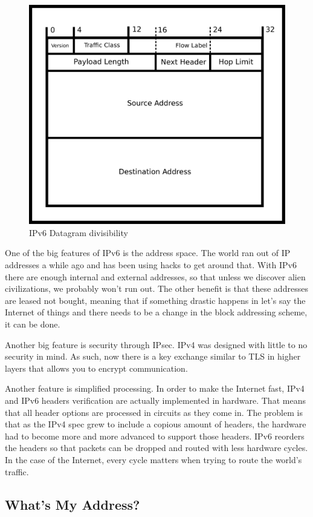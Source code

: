 \begin{figure}[H]
  \centering
\includegraphics[width=.8\textwidth]{networking/drawings/ipv6_datagram.eps}
\caption{IPv6 Datagram divisibility}
\end{figure}

One of the big features of IPv6 is the address space.
The world ran out of IP addresses a while ago and has been using hacks to get around that.
With IPv6 there are enough internal and external addresses, so that unless we discover alien civilizations, we probably won't run out.
The other benefit is that these addresses are leased not bought, meaning that if something drastic happens in let's say the Internet of things and there needs to be a change in the block addressing scheme, it can be done.

Another big feature is security through IPsec.
IPv4 was designed with little to no security in mind.
As such, now there is a key exchange similar to TLS in higher layers that allows you to encrypt communication.

Another feature is simplified processing.
In order to make the Internet fast, IPv4 and IPv6 headers verification are actually implemented in hardware.
That means that all header options are processed in circuits as they come in.
The problem is that as the IPv4 spec grew to include a copious amount of headers, the hardware had to become more and more advanced to support those headers.
IPv6 reorders the headers so that packets can be dropped and routed with less hardware cycles.
In the case of the Internet, every cycle matters when trying to route the world's traffic.

\subsection{What's My Address?}


